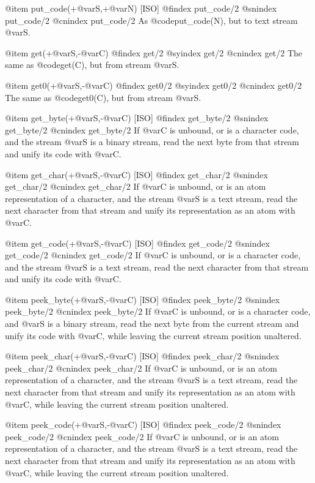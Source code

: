 {{{{{@item put_code(+@var{S},+@var{N}) [ISO]
@findex put_code/2
@snindex put_code/2
@cnindex put_code/2
As @code{put_code(N)}, but to text stream @var{S}.

@item get(+@var{S},-@var{C})
@findex get/2
@syindex get/2
@cnindex get/2
The same as @code{get(C)}, but from stream @var{S}.

@item get0(+@var{S},-@var{C})
@findex get0/2
@syindex get0/2
@cnindex get0/2
The same as @code{get0(C)}, but from stream @var{S}.

@item get_byte(+@var{S},-@var{C}) [ISO]
@findex get_byte/2
@snindex get_byte/2
@cnindex get_byte/2
If @var{C} is unbound, or is a character code, and the stream @var{S} is a
binary stream, read the next byte from that stream and unify its
code with @var{C}.

@item get_char(+@var{S},-@var{C}) [ISO]
@findex get_char/2
@snindex get_char/2
@cnindex get_char/2
If @var{C} is unbound, or is an atom representation of a character, and
the stream @var{S} is a text stream, read the next character from that
stream and unify its representation as an atom with @var{C}.

@item get_code(+@var{S},-@var{C}) [ISO]
@findex get_code/2
@snindex get_code/2
@cnindex get_code/2
If @var{C} is unbound, or is a character code, and the stream @var{S} is a
text stream, read the next character from that stream and unify its
code with @var{C}.

@item peek_byte(+@var{S},-@var{C}) [ISO]
@findex peek_byte/2
@snindex peek_byte/2
@cnindex peek_byte/2
If @var{C} is unbound, or is a character code, and @var{S} is a binary
stream, read the next byte from the current stream and unify its code
with @var{C}, while leaving the current stream position unaltered.

@item peek_char(+@var{S},-@var{C}) [ISO]
@findex peek_char/2
@snindex peek_char/2
@cnindex peek_char/2
If @var{C} is unbound, or is an atom representation of a character, and
the stream @var{S} is a text stream, read the next character from that
stream and unify its representation as an atom with @var{C}, while leaving
the current stream position unaltered.

@item peek_code(+@var{S},-@var{C}) [ISO]
@findex peek_code/2
@snindex peek_code/2
@cnindex peek_code/2
If @var{C} is unbound, or is an atom representation of a character, and
the stream @var{S} is a text stream, read the next character from that
stream and unify its representation as an atom with @var{C}, while leaving
the current stream position unaltered.

}}}}}
